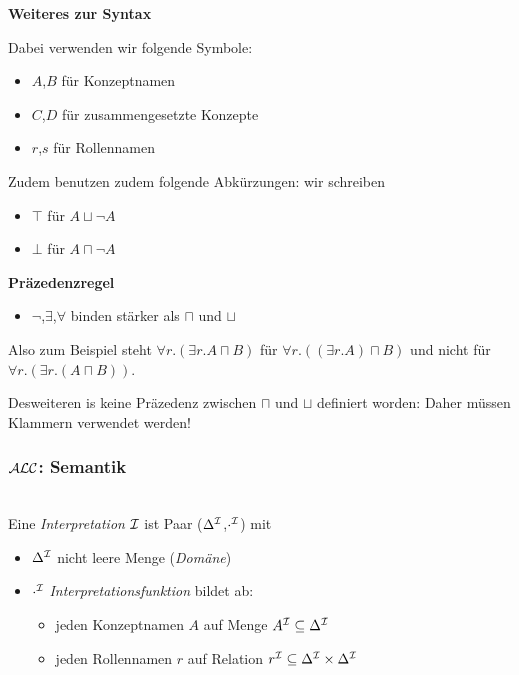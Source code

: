 \textbf{Weiteres zur Syntax}

Dabei verwenden wir folgende Symbole:

\begin{itemize}
  \item{$A$,$B$ für Konzeptnamen}
  \item{$C$,$D$ für zusammengesetzte Konzepte}
  \item{$r$,$s$ für Rollennamen}
\end{itemize}

Zudem benutzen zudem folgende Abkürzungen: wir schreiben

\begin{itemize}
  \item{$\top$ für $A \sqcup \neg A$}
  \item{$\bot$ für $A \sqcap \neg A$}
\end{itemize}

\textbf{Präzedenzregel}

\begin{itemize}
  \item{$\neg$,$\exists$,$\forall$ binden stärker als $\sqcap$ und $\sqcup$}
\end{itemize}

Also zum Beispiel steht $\forall r.(\exists r.A \sqcap B)$ für $\forall r.((\exists r.A) \sqcap B)$ und nicht für $\forall r.(\exists r.(A \sqcap B))$.

Desweiteren is keine Präzedenz zwischen $\sqcap$ und $\sqcup$ definiert worden: Daher müssen Klammern verwendet werden!

\subsubsection{\texorpdfstring{$\mathcal{A}\mathcal{L}\mathcal{C}$}{ALC}: Semantik}

\begin{definition} \\
Eine \emph{Interpretation} $\mathcal{I}$ ist Paar ($\Delta^{\mathcal{I}}$,$\cdot^{\mathcal{I}}$) mit
  \begin{itemize}
    \item{$\Delta^{\mathcal{I}}$ nicht leere Menge (\emph{Domäne})}
    \item{$\cdot^{\mathcal{I}}$ \emph{Interpretationsfunktion} bildet ab:
     \begin{itemize}
       \item{jeden Konzeptnamen $A$ auf Menge $A^{\mathcal{I}} \subseteq \Delta^{\mathcal{I}}$}
       \item{jeden Rollennamen $r$ auf Relation $r^{\mathcal{I}} \subseteq \Delta^{\mathcal{I}} \times \Delta^{\mathcal{I}}$}
     \end{itemize}}
  \end{itemize}
\end{definition}

